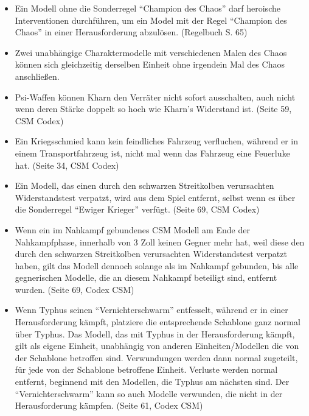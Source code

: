 \begin{itemize}

 \item Ein Modell ohne die Sonderregel ``Champion des Chaos'' darf heroische
  Interventionen durchführen, um ein Model mit der Regel ``Champion des Chaos''
  in einer Herausforderung abzulösen. (Regelbuch S. 65)

 \item Zwei unabhängige Charaktermodelle mit verschiedenen Malen des Chaos
  können sich gleichzeitig derselben Einheit ohne irgendein Mal des Chaos
  anschließen.

 \item Psi-Waffen können Kharn den Verräter nicht sofort ausschalten, auch nicht
  wenn deren Stärke doppelt so hoch wie Kharn's Widerstand ist. (Seite 59, CSM
  Codex)

 \item Ein Kriegsschmied kann kein feindliches Fahrzeug verfluchen, während er
  in einem Transportfahrzeug ist, nicht mal wenn das Fahrzeug eine Feuerluke
  hat. (Seite 34, CSM Codex)

 \item Ein Modell, das einen durch den schwarzen Streitkolben verursachten
  Widerstandstest verpatzt, wird aus dem Spiel entfernt, selbst wenn es über die
  Sonderregel ``Ewiger Krieger'' verfügt. (Seite 69, CSM Codex)

 \item Wenn ein im Nahkampf gebundenes CSM Modell am Ende der Nahkampfphase,
  innerhalb von 3 Zoll keinen Gegner mehr hat, weil diese den durch den
  schwarzen Streitkolben verursachten Widerstandstest verpatzt haben, gilt das
  Modell dennoch solange als im Nahkampf gebunden, bis alle gegnerischen
  Modelle, die an diesem Nahkampf beteiligt sind, entfernt wurden. (Seite 69,
  Codex CSM)

 \item Wenn Typhus seinen ``Vernichterschwarm'' entfesselt, während er in einer
  Herausforderung kämpft, platziere die entsprechende Schablone ganz normal über
  Typhus. Das Modell, das mit Typhus in der Herausforderung kämpft, gilt als
  eigene Einheit, unabhängig von anderen Einheiten/Modellen die von der
  Schablone betroffen sind. Verwundungen werden dann normal zugeteilt, für jede
  von der Schablone betroffene Einheit. Verluste werden normal entfernt,
  beginnend mit den Modellen, die Typhus am nächsten sind. Der
  ``Vernichterschwarm'' kann so auch Modelle verwunden, die nicht in der
  Herausforderung kämpfen. (Seite 61, Codex CSM)


\end{itemize}
